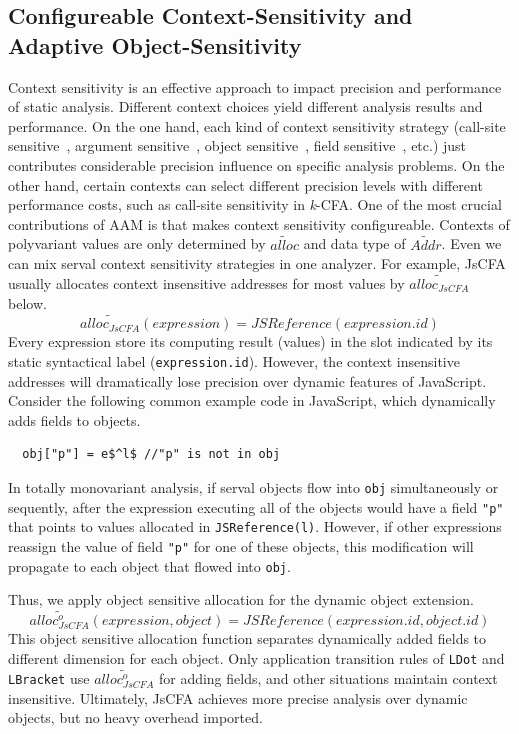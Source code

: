 \documentclass{article}
\begin{document}
\subsection{Configureable Context-Sensitivity and Adaptive Object-Sensitivity}
\label{sub:Configureable}
Context sensitivity is an effective approach to impact precision and performance of static analysis.
Different context choices yield different analysis results and performance.
On the one hand, each kind of context sensitivity strategy (call-site sensitive~\cite{shivers1991control}, argument sensitive~\cite{agesen1995cartesian}, object sensitive~\cite{milanova2005parameterized, smaragdakis2011pick}, field sensitive~\cite{lhotak2003scaling}, etc.) just contributes considerable precision influence on specific analysis problems.
On the other hand, certain contexts can select different precision levels with different performance costs, such as call-site sensitivity in \textit{k}-CFA\@.
One of the most crucial contributions of AAM is that makes context sensitivity configureable.
Contexts of polyvariant values are only determined by $\widetilde{alloc}$ and data type of $\widetilde{Addr}$. %
Even we can mix serval context sensitivity strategies in one analyzer.
For example, JsCFA usually allocates context insensitive addresses for most values by $\widetilde{alloc_{JsCFA}}$ below.
\[
\widetilde{alloc_{JsCFA}}(expression) = JSReference(expression.id)
\]
Every expression store its computing result (values) in the slot indicated by its static syntactical label (\verb|expression.id|).
However, the context insensitive addresses will dramatically lose precision over dynamic features of JavaScript.
Consider the following common example code in JavaScript, which dynamically adds fields to objects.
\lstset{mathescape}
\begin{lstlisting}
  obj["p"] = e$^l$ //"p" is not in obj
\end{lstlisting}
In totally monovariant analysis, if serval objects flow into \verb|obj| simultaneously or sequently, after the expression executing all of the objects would have a field \verb|"p"| that points to values allocated in \verb|JSReference(l)|.
However, if other expressions reassign the value of field \verb|"p"| for one of these objects, this modification will propagate to each object that flowed into \verb|obj|.

Thus, we apply object sensitive allocation for the dynamic object extension.
\[
\widetilde{alloc^{o}_{JsCFA}}(expression, object) = JSReference(expression.id, object.id)
\]
This object sensitive allocation function separates dynamically added fields to different dimension for each object. Only application transition rules of \verb|LDot| and \verb|LBracket| use $\widetilde{alloc^{o}_{JsCFA}}$ for adding fields, and other situations maintain context insensitive.
Ultimately, JsCFA achieves more precise analysis over dynamic objects, but no heavy overhead imported.
\end{document}
